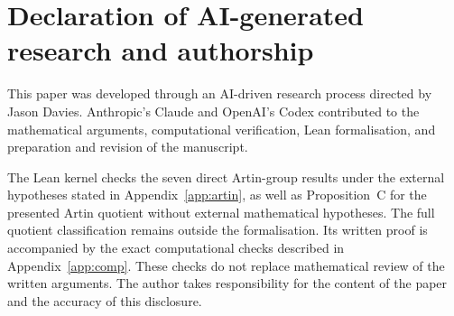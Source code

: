 \documentclass[11pt]{article}
\theoremstyle{definition}
\begin{document}
\section*{Declaration of AI-generated research and authorship}
This paper was developed through an AI-driven research process directed by Jason Davies.
Anthropic's Claude and OpenAI's Codex contributed to the mathematical arguments, computational
verification, Lean formalisation, and preparation and revision of the manuscript.

The Lean kernel checks the seven direct Artin-group results under the external hypotheses stated in
Appendix~\ref{app:artin}, as well as Proposition~C for the presented Artin quotient without external
mathematical hypotheses. The full quotient classification remains outside the formalisation.
Its written proof is accompanied by
the exact computational checks described in Appendix~\ref{app:comp}. These checks do not replace mathematical review of the written arguments.
The author takes responsibility for the content of the paper and the accuracy of this disclosure.
\end{document}
